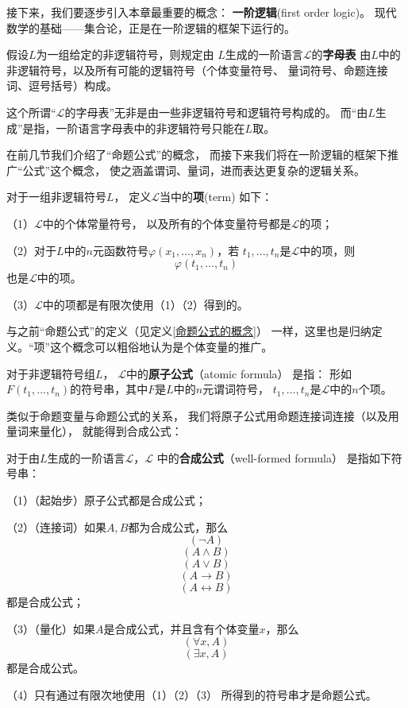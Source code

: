 接下来，我们要逐步引入本章最重要的概念：
\textbf{一阶逻辑}(first order logic)。
现代数学的基础——集合论，正是在一阶逻辑的框架下运行的。

\begin{definition}[一阶逻辑的字母表]
假设$L$为一组给定的非逻辑符号，则规定由
$L$生成的一阶语言$\mathcal{L}$的\textbf{字母表}
由$L$中的非逻辑符号，以及所有可能的逻辑符号（个体变量符号、
量词符号、命题连接词、逗号括号）构成。
\end{definition}

这个所谓“$\mathcal{L}$的字母表”无非是由一些非逻辑符号和逻辑符号构成的。
而“由$L$生成”是指，一阶语言字母表中的非逻辑符号只能在$L$取。

在前几节我们介绍了“命题公式”的概念，
而接下来我们将在一阶逻辑的框架下推广“公式”这个概念，
使之涵盖谓词、量词，进而表达更复杂的逻辑关系。

\begin{definition}[项]对于一组非逻辑符号$L$，
定义$\mathcal{L}$当中的\textbf{项}(term)
如下：

（1）$\mathcal{L}$中的个体常量符号，
以及所有的个体变量符号都是$\mathcal{L}$的项；

（2）对于$L$中的$n$元函数符号$\varphi(x_1,...,x_n)$，若
$t_1,...,t_n$是$\mathcal{L}$中的项，则
$$\varphi(t_1,...,t_n)$$
也是$\mathcal{L}$中的项。

（3）$\mathcal{L}$中的项都是有限次使用（1）（2）得到的。
\end{definition}

与之前“命题公式”的定义（见定义\ref{命题公式的概念}）
一样，这里也是归纳定义。“项”这个概念可以粗俗地认为是个体变量的推广。

\begin{definition}[原子公式]对于非逻辑符号组$L$，
$\mathcal{L}$中的\textbf{原子公式}（atomic formula）
是指：
形如$F(t_1,...,t_n)$的符号串，其中$F$是$L$中的$n$元谓词符号，
$t_1,...,t_n$是$\mathcal{L}$中的$n$个项。
\end{definition}

类似于命题变量与命题公式的关系，
我们将原子公式用命题连接词连接（以及用量词来量化），
就能得到合成公式：

\begin{definition}[合成公式]
对于由$L$生成的一阶语言$\mathcal{L}$，$\mathcal{L}$
中的\textbf{合成公式}（well-formed formula）
是指如下符号串：

（1）（起始步）原子公式都是合成公式；

（2）（连接词）如果$A,B$都为合成公式，那么
$$(\neg A)$$
$$(A\wedge B)$$
$$(A\vee B)$$
$$(A\rightarrow B)$$
$$(A\leftrightarrow B)$$
都是合成公式；

（3）（量化）如果$A$是合成公式，并且含有个体变量$x$，那么
$$(\forall x,A)$$
$$(\exists x,A)$$
都是合成公式。

（4）只有通过有限次地使用（1）（2）（3）
所得到的符号串才是命题公式。
\end{definition}

